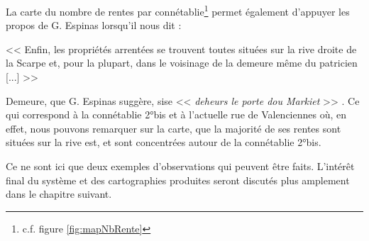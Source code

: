 La carte du nombre de rentes par connétablie\footnote{c.f. figure \ref{fig:mapNbRente}} permet également d'appuyer les propos de G. Espinas lorsqu'il nous dit : 
\begin{displayquote}
    << Enfin, les propriétés arrentées se trouvent toutes situées sur la rive droite de la Scarpe et, pour la plupart, dans le voisinage de la demeure même du patricien [...] >> 
\end{displayquote} 
Demeure, que G. Espinas suggère, sise << \textit{deheurs le porte dou Markiet} >> \parencite{espinas_les_1933}. Ce qui correspond à la connétablie 2°bis et à l'actuelle rue de Valenciennes où, en effet, nous pouvons remarquer sur la carte, que la  majorité de ses rentes sont situées sur la rive est, et sont concentrées autour de la connétablie 2°bis.

Ce ne sont ici que deux exemples d'observations qui peuvent être faits. L'intérêt final du système et des cartographies produites seront discutés plus amplement dans le chapitre suivant.



